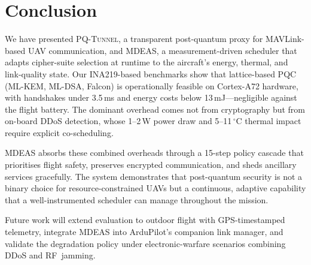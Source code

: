 \documentclass[conference]{IEEEtran}
\newcommand{\sysname}{\textsc{PQ\nobreakdash-Tunnel}}
\newcommand{\mdeas}{\textsc{MDEAS}}
\begin{document}
\section{Conclusion}
\label{sec:conc}

We have presented \sysname{}, a transparent post-quantum proxy for
MAVLink-based UAV communication, and \mdeas{}, a measurement-driven
scheduler that adapts cipher-suite selection at runtime to the
aircraft's energy, thermal, and link-quality state.  Our INA219-based
benchmarks show that lattice-based PQC (ML-KEM, ML-DSA, Falcon) is
operationally feasible on Cortex-A72 hardware, with handshakes under
3.5\,ms and energy costs below 13\,mJ---negligible against the
flight battery.  The dominant overhead comes not from cryptography
but from on-board DDoS detection, whose 1--2\,W power draw and
5--11\,$^\circ$C thermal impact require explicit co-scheduling.

\mdeas{} absorbs these combined overheads through a 15-step policy
cascade that prioritises flight safety, preserves encrypted
communication, and sheds ancillary services gracefully.  The system
demonstrates that post-quantum security is not a binary choice for
resource-constrained UAVs but a continuous, adaptive capability that
a well-instrumented scheduler can manage throughout the mission.

Future work will extend evaluation to outdoor flight with
GPS-timestamped telemetry, integrate \mdeas{} into ArduPilot's
companion link manager, and validate the degradation policy under
electronic-warfare scenarios combining DDoS and RF~jamming.

\balance


\end{document}
